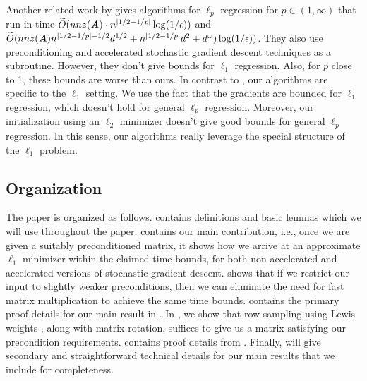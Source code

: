 Another related work by \cite{BubeckCLL17:arxiv} gives algorithms for $\ell_p$ regression for $p \in (1,\infty)$ that run in time $\widetilde{O}(nnz(\boldsymbol{\mathit{A}}) \cdot n^{|1/2 - 1/p|} \log(1 / \epsilon) )$ and $\widetilde{O}(nnz(\boldsymbol{\mathit{A}}) n^{|1/2 - 1/p| - 1/2} d^{1/2} + n^{|1 /2  - 1/p|} d^{2} + d^{\omega}) \log(1 / \epsilon) )$. They also use preconditioning and accelerated stochastic gradient descent techniques as a subroutine. However, they don't give bounds for $\ell_1$ regression. Also, for $p$ close to 1, these bounds are worse than ours. In contrast to \cite{BubeckCLL17:arxiv}, our algorithms are specific to the $\ell_1$ setting. We use the fact that the gradients are bounded for $\ell_1$ regression, which doesn't hold for general $\ell_p$ regression. Moreover, our initialization using an $\ell_2$ minimizer doesn't give good bounds for general $\ell_p$ regression. In this sense, our algorithms really leverage the special structure of the $\ell_1$ problem.



%  




\subsection{Organization}
The paper is organized as follows.
 contains definitions and basic lemmas
which we will use throughout the paper.
 contains our main contribution, i.e.,
once we are given a suitably preconditioned matrix,
it shows how we arrive at an approximate $\ell_1$
minimizer within the claimed time bounds,
for both non-accelerated and accelerated versions
of stochastic gradient descent.
 shows that
if we restrict our input to slightly weaker
preconditions, then we can eliminate the need for
fast matrix multiplication to achieve the same time bounds.
 contains the primary proof details
for our main result in .
In , we show that row sampling using
Lewis weights \cite{cohenpeng},
along with matrix rotation, suffices to give us
a matrix satisfying our precondition requirements.
 contains proof
details from .
Finally,  will give secondary and straightforward technical details for our main results that we include for completeness.